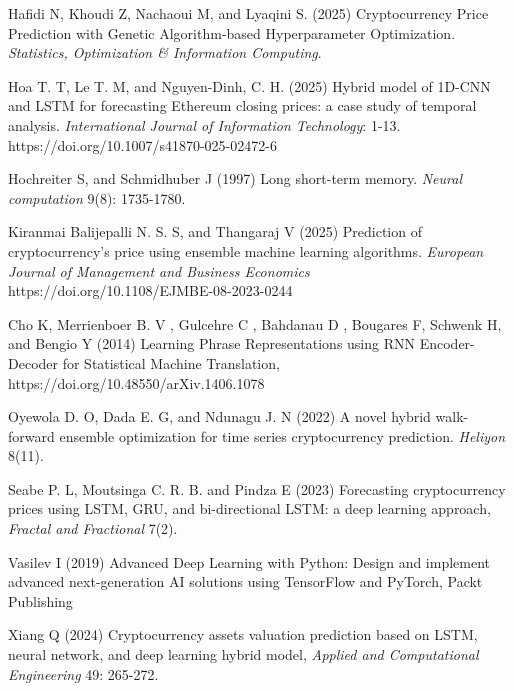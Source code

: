 \documentclass{dsfe}
\begin{document}
\begin{thebibliography}{999}
\newblock Hafidi N, Khoudi Z, Nachaoui M, and Lyaqini S. (2025)
\newblock Cryptocurrency Price Prediction with Genetic Algorithm-based Hyperparameter Optimization. 
\newblock \emph{Statistics, Optimization \& Information Computing}.

\newblock Hoa T. T, Le T. M, and Nguyen-Dinh, C. H. (2025)
\newblock Hybrid model of 1D-CNN and LSTM for forecasting Ethereum closing prices: a case study of temporal analysis.
\newblock \emph{ International Journal of Information Technology}: 1-13.
https://doi.org/10.1007/s41870-025-02472-6

\newblock Hochreiter S, and Schmidhuber J (1997) Long short-term memory. 
\newblock \emph{Neural computation} 9(8): 1735-1780.

\newblock Kiranmai Balijepalli N. S. S, and Thangaraj V (2025)
\newblock Prediction of cryptocurrency’s price using ensemble machine learning algorithms.
\newblock \emph{European Journal of Management and Business Economics}
 https://doi.org/10.1108/EJMBE-08-2023-0244

\newblock  Cho K, Merrienboer B. V , Gulcehre C , Bahdanau D , Bougares F, Schwenk H, and Bengio Y (2014)
\newblock Learning Phrase Representations using RNN Encoder-Decoder for Statistical Machine Translation,
\newblock https://doi.org/10.48550/arXiv.1406.1078 

\newblock Oyewola D. O, Dada E. G, and Ndunagu J. N (2022)
\newblock A novel hybrid walk-forward ensemble optimization for time series cryptocurrency prediction. 
\newblock \emph{Heliyon} 8(11).

\newblock Seabe P. L, Moutsinga C. R. B. and Pindza E (2023)
\newblock Forecasting cryptocurrency prices using LSTM, GRU, and bi-directional LSTM: a deep learning approach, 
\newblock \emph{Fractal and Fractional} 7(2).

\newblock Vasilev I (2019) Advanced Deep Learning with Python: Design and implement advanced next-generation AI solutions using TensorFlow and PyTorch,
\newblock \emph{ }
\newblock Packt Publishing

\newblock Xiang Q (2024) Cryptocurrency assets valuation prediction based on LSTM, neural network, and deep learning hybrid model,
\newblock \emph{Applied and Computational Engineering} 49: 265-272.


\end{thebibliography}
\end{document}
